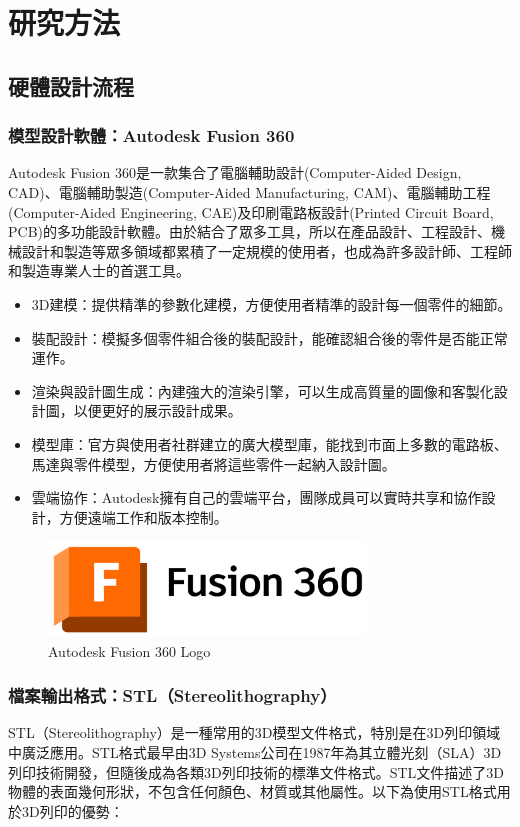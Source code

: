 \documentclass[class=NCU_thesis, crop=false]{standalone}
\begin{document}
\chapter{研究方法}
\section{硬體設計流程}
\subsection{模型設計軟體：Autodesk Fusion 360}
Autodesk Fusion 360是一款集合了電腦輔助設計(Computer-Aided Design, CAD)、電腦輔助製造(Computer-Aided Manufacturing, CAM)、電腦輔助工程(Computer-Aided Engineering, CAE)及印刷電路板設計(Printed Circuit Board, PCB)的多功能設計軟體。由於結合了眾多工具，所以在產品設計、工程設計、機械設計和製造等眾多領域都累積了一定規模的使用者，也成為許多設計師、工程師和製造專業人士的首選工具。

\begin{itemize}
    \item 3D建模：提供精準的參數化建模，方便使用者精準的設計每一個零件的細節。
    \item 裝配設計：模擬多個零件組合後的裝配設計，能確認組合後的零件是否能正常運作。
    \item 渲染與設計圖生成：內建強大的渲染引擎，可以生成高質量的圖像和客製化設計圖，以便更好的展示設計成果。
    \item 模型庫：官方與使用者社群建立的廣大模型庫，能找到市面上多數的電路板、馬達與零件模型，方便使用者將這些零件一起納入設計圖。
    \item 雲端協作：Autodesk擁有自己的雲端平台，團隊成員可以實時共享和協作設計，方便遠端工作和版本控制。
\end{itemize}

\begin{figure}[htbp]
    \centering
    \includegraphics[width=0.75\textwidth]{figures/autodesk-fusion-360-seeklogo.png}
\caption{Autodesk Fusion 360 Logo~\cite{autodesk_echo_dot}}
\end{figure}

\subsection{檔案輸出格式：STL（Stereolithography）}
STL（Stereolithography）是一種常用的3D模型文件格式，特別是在3D列印領域中廣泛應用。STL格式最早由3D Systems公司在1987年為其立體光刻（SLA）3D列印技術開發，但隨後成為各類3D列印技術的標準文件格式。STL文件描述了3D物體的表面幾何形狀，不包含任何顏色、材質或其他屬性。以下為使用STL格式用於3D列印的優勢：
\end{document}
